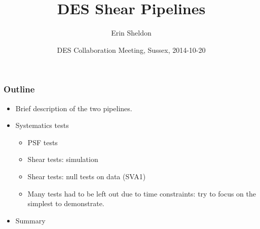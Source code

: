 \documentclass{beamer}
\begin{document}


\title{DES Shear Pipelines}
\author{Erin Sheldon}
\date{DES Collaboration Meeting, Sussex, 2014-10-20 }

\frame{\titlepage}

\frame
{
    \frametitle{Outline}

    \begin{itemize}

        \item Brief description of the two pipelines.
        \item Systematics tests
            \begin{itemize}
                \item PSF tests
                \item Shear tests: simulation
                \item Shear tests: null tests on data (SVA1)

                \item Many tests had to be left out due to time constraints:
                    try to focus on the simplest to demonstrate.

            \end{itemize}
        \item Summary
    \end{itemize}
}
 
\end{document}
